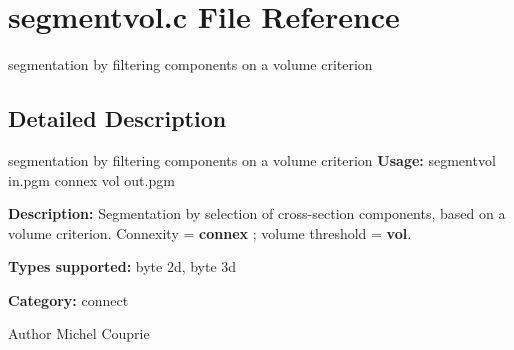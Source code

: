 \section{segmentvol.c File Reference}
\label{segmentvol_8c}


segmentation by filtering components on a volume criterion  




\subsection{Detailed Description}
segmentation by filtering components on a volume criterion {\bfseries Usage:} segmentvol in.pgm connex vol out.pgm

{\bfseries Description:} Segmentation by selection of cross-\/section components, based on a volume criterion. Connexity = {\bfseries connex} ; volume threshold = {\bfseries vol}.

{\bfseries Types supported:} byte 2d, byte 3d

{\bfseries Category:} connect

\begin{DoxyAuthor}{Author}
Michel Couprie 
\end{DoxyAuthor}

